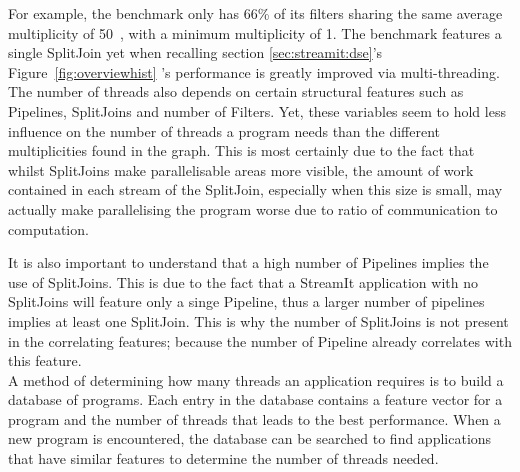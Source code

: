 For example, the benchmark  only has 66\% of its filters sharing the same average multiplicity of 50~\cite{thiesStreamit2010}, with a minimum multiplicity of 1. 
The benchmark features a single SplitJoin yet when recalling section \ref{sec:streamit:dse}'s Figure~\ref{fig:overviewhist} 's performance is greatly improved via multi-threading.
The number of threads also depends on certain structural features such as Pipelines, SplitJoins and number of Filters.
Yet, these variables seem to hold less influence on the number of threads a program needs than the different multiplicities found in the graph.
This is most certainly due to the fact that whilst SplitJoins make parallelisable areas more visible, the amount of work contained in each stream of the SplitJoin, especially when this size is small, may actually make parallelising the program worse due to ratio of communication to computation.

It is also important to understand that a high number of Pipelines implies the use of SplitJoins.
This is due to the fact that a StreamIt application with no SplitJoins will feature only a singe Pipeline, thus a larger number of pipelines implies at least one SplitJoin.
This is why the number of SplitJoins is not present in the correlating features; because the number of Pipeline already correlates with this feature.\\


A method of determining how many threads an application requires is to build a database of programs.
Each entry in the database contains a feature vector for a program and the number of threads that leads to the best performance.
When a new program is encountered, the database can be searched to find applications that have similar features to determine the number of threads needed.

